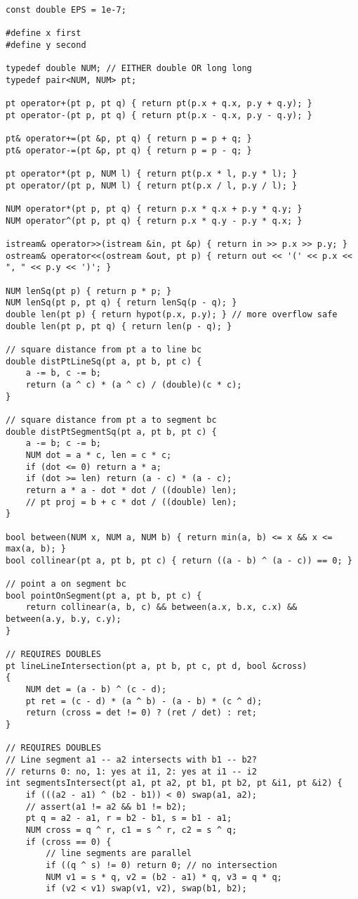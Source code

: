 \documentclass{article}
\begin{document}
\begin{lstlisting}
const double EPS = 1e-7;

#define x first
#define y second

typedef double NUM; // EITHER double OR long long
typedef pair<NUM, NUM> pt;

pt operator+(pt p, pt q) { return pt(p.x + q.x, p.y + q.y); }
pt operator-(pt p, pt q) { return pt(p.x - q.x, p.y - q.y); }

pt& operator+=(pt &p, pt q) { return p = p + q; }
pt& operator-=(pt &p, pt q) { return p = p - q; }

pt operator*(pt p, NUM l) { return pt(p.x * l, p.y * l); }
pt operator/(pt p, NUM l) { return pt(p.x / l, p.y / l); }

NUM operator*(pt p, pt q) { return p.x * q.x + p.y * q.y; }
NUM operator^(pt p, pt q) { return p.x * q.y - p.y * q.x; }

istream& operator>>(istream &in, pt &p) { return in >> p.x >> p.y; }
ostream& operator<<(ostream &out, pt p) { return out << '(' << p.x << ", " << p.y << ')'; }

NUM lenSq(pt p) { return p * p; }
NUM lenSq(pt p, pt q) { return lenSq(p - q); }
double len(pt p) { return hypot(p.x, p.y); } // more overflow safe
double len(pt p, pt q) { return len(p - q); }

// square distance from pt a to line bc
double distPtLineSq(pt a, pt b, pt c) {
	a -= b, c -= b;
	return (a ^ c) * (a ^ c) / (double)(c * c);
}

// square distance from pt a to segment bc
double distPtSegmentSq(pt a, pt b, pt c) {
	a -= b; c -= b;
	NUM dot = a * c, len = c * c;
	if (dot <= 0) return a * a;
	if (dot >= len) return (a - c) * (a - c);
	return a * a - dot * dot / ((double) len);
	// pt proj = b + c * dot / ((double) len);
}

bool between(NUM x, NUM a, NUM b) { return min(a, b) <= x && x <= max(a, b); }
bool collinear(pt a, pt b, pt c) { return ((a - b) ^ (a - c)) == 0; }

// point a on segment bc
bool pointOnSegment(pt a, pt b, pt c) {
	return collinear(a, b, c) && between(a.x, b.x, c.x) && between(a.y, b.y, c.y);
}

// REQUIRES DOUBLES
pt lineLineIntersection(pt a, pt b, pt c, pt d, bool &cross)
{
	NUM det = (a - b) ^ (c - d);
	pt ret = (c - d) * (a ^ b) - (a - b) * (c ^ d);
	return (cross = det != 0) ? (ret / det) : ret;
}

// REQUIRES DOUBLES
// Line segment a1 -- a2 intersects with b1 -- b2?
// returns 0: no, 1: yes at i1, 2: yes at i1 -- i2
int segmentsIntersect(pt a1, pt a2, pt b1, pt b2, pt &i1, pt &i2) {
	if (((a2 - a1) ^ (b2 - b1)) < 0) swap(a1, a2);
	// assert(a1 != a2 && b1 != b2);
	pt q = a2 - a1, r = b2 - b1, s = b1 - a1;
	NUM cross = q ^ r, c1 = s ^ r, c2 = s ^ q;
	if (cross == 0) {
		// line segments are parallel
		if ((q ^ s) != 0) return 0; // no intersection
		NUM v1 = s * q, v2 = (b2 - a1) * q, v3 = q * q;
		if (v2 < v1) swap(v1, v2), swap(b1, b2);


\end{lstlisting}
\end{document}
